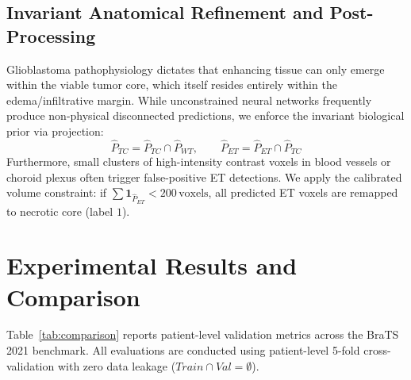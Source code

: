 \documentclass[runningheads]{llncs}
\begin{document}
\subsection{Invariant Anatomical Refinement and Post-Processing}
Glioblastoma pathophysiology dictates that enhancing tissue can only emerge within the viable tumor core, which itself resides entirely within the edema/infiltrative margin. While unconstrained neural networks frequently produce non-physical disconnected predictions, we enforce the invariant biological prior via projection:
\begin{equation}
    \hat{P}_{TC} = \hat{P}_{TC} \cap \hat{P}_{WT}, \qquad \hat{P}_{ET} = \hat{P}_{ET} \cap \hat{P}_{TC}
\end{equation}
Furthermore, small clusters of high-intensity contrast voxels in blood vessels or choroid plexus often trigger false-positive ET detections. We apply the calibrated volume constraint: if $\sum \mathbf{1}_{\hat{P}_{ET}} < 200\,\text{voxels}$, all predicted ET voxels are remapped to necrotic core (label $1$).

\section{Experimental Results and Comparison}

Table~\ref{tab:comparison} reports patient-level validation metrics across the BraTS 2021 benchmark. All evaluations are conducted using patient-level 5-fold cross-validation with zero data leakage ($Train \cap Val = \emptyset$).
\end{document}
